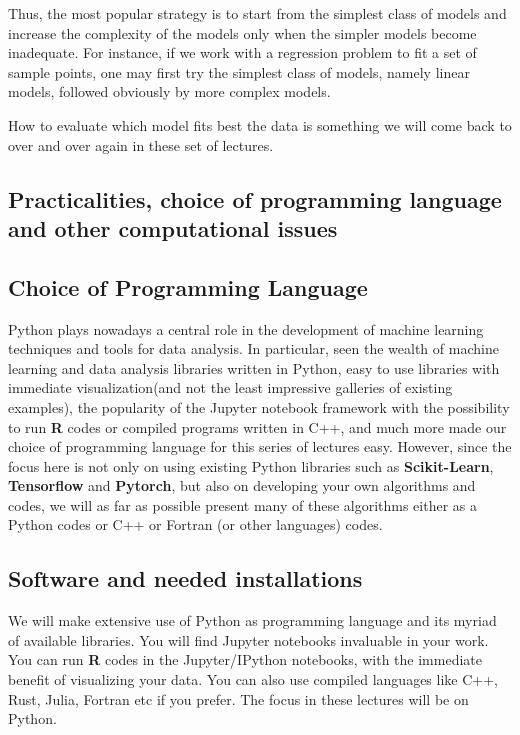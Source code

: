 \documentclass[%
oneside,                 %
final,                   %
10pt]{article}
\begin{document}
Thus, the most popular strategy is to start from the
simplest class of models and increase the complexity of the models only when the
simpler models become inadequate. For instance, if we work with a regression problem to fit a set of sample points, one
may first try the simplest class of models, namely linear models, followed obviously by more complex models.

How to evaluate which model fits best the data is something we will come back to over and over again in these set of lectures.

\subsection{Practicalities, choice of programming language and other computational issues}

\subsection{Choice of Programming Language}

Python plays nowadays a central role in the development of machine
learning techniques and tools for data analysis. In particular, seen
the wealth of machine learning and data analysis libraries written in
Python, easy to use libraries with immediate visualization(and not the
least impressive galleries of existing examples), the popularity of the
Jupyter notebook framework with the possibility to run \textbf{R} codes or
compiled programs written in C++, and much more made our choice of
programming language for this series of lectures easy. However,
since the focus here is not only on using existing Python libraries such
as \textbf{Scikit-Learn}, \textbf{Tensorflow} and \textbf{Pytorch}, but also on developing your own
algorithms and codes, we will as far as possible present many of these
algorithms either as a Python codes or C++ or Fortran (or other languages) codes. 






\subsection{Software and needed installations}

We will make extensive use of Python as programming language and its
myriad of available libraries.  You will find
Jupyter notebooks invaluable in your work.  You can run \textbf{R}
codes in the Jupyter/IPython notebooks, with the immediate benefit of
visualizing your data. You can also use compiled languages like C++,
Rust, Julia, Fortran etc if you prefer. The focus in these lectures will be
on Python.
\end{document}
